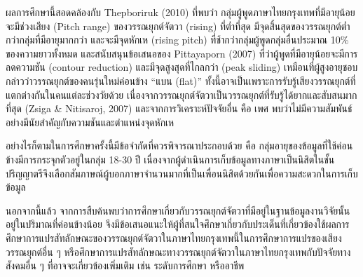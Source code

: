 \documentclass[a4paper]{article}
\begin{document}
    ผลการศึกษานี้สอดคล้องกับ Thepboriruk (2010) ที่พบว่า กลุ่มผู้พูดภาษาไทยกรุงเทพที่มีอายุน้อย จะมีช่วงเสียง (Pitch range) ของวรรณยุกต์จัตวา (rising) ที่ต่ำที่สุด มีจุดสิ้นสุดของวรรณยุกต์ต่ำกว่ากลุ่มที่มีอายุมากกว่า และจะมีจุดหักเห (rising pitch) ที่ช้ากว่ากลุ่มผู้พูดกลุ่มอื่นประมาณ 10\% ของความยาวทั้งหมด และสนับสนุนข้อเสนอของ Pittayaporn (2007) ที่ว่าผู้พูดที่มีอายุน้อยจะมีการลดความชัน (contour reduction) และมีจุดสูงสุดที่ไกลกว่า (peak sliding) เหมือนที่ผู้สูงอายุชอบกล่าวว่าวรรณยุกต์ของคนรุ่นใหม่ค่อนข้าง “แบน (flat)” ทั้งนี้อาจเป็นเพราะการรับรู้เสียงวรรณยุกต์ที่แตกต่างกันในคนแต่ละช่วงวัยด้วย เนื่องจากวรรณยุกต์จัตวาเป็นวรรณยุกต์ที่รับรู้ได้ยากและสับสนมากที่สุด (Zsiga \& Nitisaroj, 2007) และจากการวิเคราะห์ปัจจัยอื่น คือ เพศ พบว่าไม่มีความสัมพันธ์อย่างมีนัยสำคัญกับความชันและตำแหน่งจุดหักเห

    อย่างไรก็ตามในการศึกษาครั้งนี้มีข้อจำกัดที่ควรพิจารณาประกอบด้วย คือ กลุ่มอายุของข้อมูลที่ใช้ค่อนข้างมีการกระจุกตัวอยู่ในกลุ่ม 18-30 ปี เนื่องจากผู้ดำเนินการเก็บข้อมูลทางภาษาเป็นนิสิตในชั้นปริญญาตรีจึงเลือกสัมภาษณ์ผู้บอกภาษาจำนวนมากที่เป็นเพื่อนนิสิตด้วยกันเพื่อความสะดวกในการเก็บข้อมูล

    นอกจากนี้แล้ว จากการสืบค้นพบว่าการศึกษาเกี่ยวกับวรรณยุกต์จัตวาที่มีอยู่ในฐานข้อมูลงานวิจัยนั้นอยู่ในปริมาณที่ค่อนข้างน้อย จึงมีข้อเสนอแนะให้ผู้ที่สนใจศึกษาเกี่ยวกับประเด็นที่เกี่ยวข้องใช้ผลการศึกษาการแปรสัทลักษณะของวรรณยุกต์จัตวาในภาษาไทยกรุงเทพนี้ในการศึกษาการแปรของเสียงวรรณยุกต์อื่น ๆ หรือศึกษาการแปรสัทลักษณะทางวรรณยุกต์จัตวาในภาษาไทยกรุงเทพกับปัจจัยทางสังคมอื่น ๆ ที่อาจจะเกี่ยวข้องเพิ่มเติม เช่น ระดับการศึกษา หรืออาชีพ
    \newpage
\end{document}
